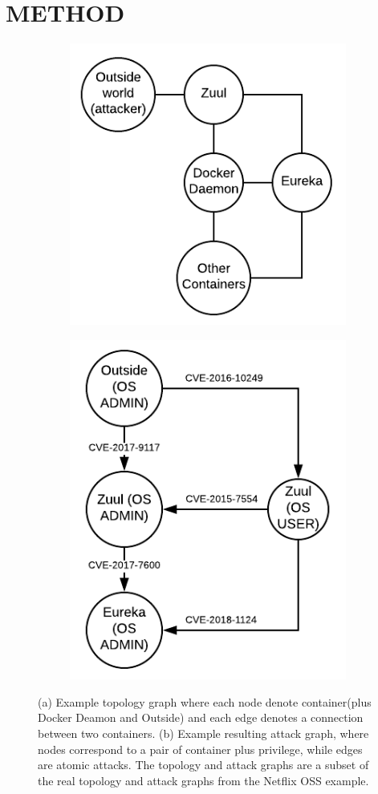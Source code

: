 \section{METHOD}
\label{chap:method}

\begin{figure}
	\centering
	\begin{subfigure}[b]{0.5\textwidth}
		\centering
		\includegraphics[width=.6\linewidth]{./images/Topology_graph}
		\caption{}
		\label{TopologyGraph}
	\end{subfigure}
	
	\begin{subfigure}[b]{0.5\textwidth}
		\centering
		\includegraphics[width=.6\linewidth]{./images/Attack_graph}
		\caption{}
		\label{AttackGraph}
	\end{subfigure}
	
	\caption[Two numerical solutions]{(a) Example topology graph where each node denote container(plus Docker Deamon and Outside) and each edge denotes a connection between two containers. (b) Example resulting attack graph, where nodes correspond to a pair of container plus privilege, while edges are atomic attacks. The topology and attack graphs are a subset of the real topology and attack graphs from the Netflix OSS example.}
\end{figure}

